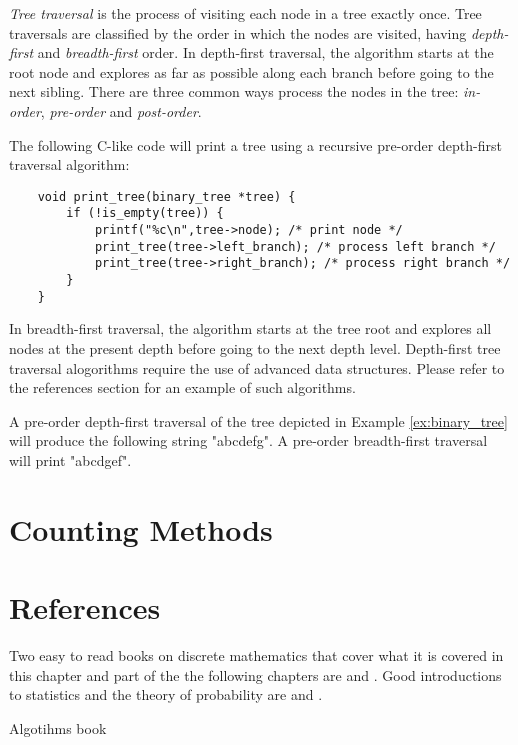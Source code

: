 \emph{Tree traversal} is the process of visiting each node in a tree exactly once. Tree traversals are classified by the order in which the nodes are visited, having \emph{depth-first} and \emph{breadth-first} order. In depth-first traversal, the algorithm starts at the root node and explores as far as possible along each branch before going to the next sibling. There are three common ways process the nodes in the tree: \emph{in-order}, \emph{pre-order} and \emph{post-order}.

The following C-like code will print a tree using a recursive pre-order depth-first traversal algorithm:

\begin{verbatim}
    void print_tree(binary_tree *tree) {
        if (!is_empty(tree)) {
            printf("%c\n",tree->node); /* print node */
            print_tree(tree->left_branch); /* process left branch */
            print_tree(tree->right_branch); /* process right branch */
        }
    }
\end{verbatim}

In breadth-first traversal, the algorithm starts at the tree root and explores all nodes at the present depth before going to the next depth level. Depth-first tree traversal alogorithms require the use of advanced data structures. Please refer to the references section for an example of such algorithms.

\begin{example}
A pre-order depth-first traversal of the tree depicted in Example \ref{ex:binary_tree} will produce the following string "abcdefg". A pre-order breadth-first traversal will print "abcdgef".
\end{example}

%
%

\section{Counting Methods}
\label{sec:counting}








\section*{References}

Two easy to read books on discrete mathematics that cover what it is covered in this chapter and part of the the following chapters are \cite{rosen1995discrete} and \cite{epp2010discrete}. Good introductions to statistics and the theory of probability are \cite{degroot1986probability} and \cite{spiegel2012probability}.

{\color{red} Algotihms book}
